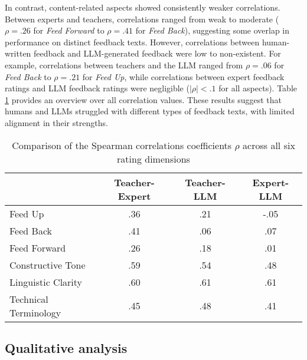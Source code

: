 In contrast, content-related aspects showed consistently weaker correlations. Between experts and teachers, correlations ranged from weak to moderate ($\rho = .26$ for \textit{Feed Forward} to $\rho = .41$ for \textit{Feed Back}), suggesting some overlap in performance on distinct feedback texts. However, correlations between human-written feedback and LLM-generated feedback were low to non-existent. For example, correlations between teachers and the LLM ranged from $\rho = .06$ for \textit{Feed Back} to $\rho = .21$ for \textit{Feed Up}, while correlations between expert feedback ratings and LLM feedback ratings were negligible ($|\rho| < .1$ for all aspects). Table \ref{tab:correlations} provides an overview over all correlation values. These results suggest that humans and LLMs struggled with different types of feedback texts, with limited alignment in their strengths.


\begin{table}[ht]
    \centering
    \begin{tabular}{lccc}
        \toprule
        & Teacher-Expert & Teacher-LLM & Expert-LLM \\
        \midrule
        Feed Up           &      .36      &    .21       &     -.05      \\
        Feed Back         &     .41       &    .06       &    .07       \\
        Feed Forward      &      .26      &     .18      &    .01       \\
        Constructive Tone &       .59     &    .54       &    .48       \\
        Linguistic Clarity&     .60       &     .61      &    .61       \\
        Technical Terminology &   .45    &     .48      &      .41     \\
        \bottomrule
    \end{tabular}
    \caption{Comparison of the Spearman correlations coefficients $\rho$ across all six rating dimensions}
    \label{tab:correlations}
\end{table}




\subsection{Qualitative analysis}\label{sec:qualitative_example}

